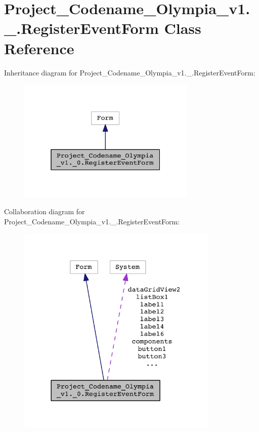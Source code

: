 \hypertarget{classProject__Codename__Olympia__v1_1_1__0_1_1RegisterEventForm}{}\section{Project\+\_\+\+Codename\+\_\+\+Olympia\+\_\+v1.\+\_.\+Register\+Event\+Form Class Reference}
\label{classProject__Codename__Olympia__v1_1_1__0_1_1RegisterEventForm}


Inheritance diagram for Project\+\_\+\+Codename\+\_\+\+Olympia\+\_\+v1.\+\_.\+Register\+Event\+Form\+:\nopagebreak
\begin{figure}[H]
\begin{center}
\leavevmode
\includegraphics[width=241pt]{classProject__Codename__Olympia__v1_1_1__0_1_1RegisterEventForm__inherit__graph}
\end{center}
\end{figure}


Collaboration diagram for Project\+\_\+\+Codename\+\_\+\+Olympia\+\_\+v1.\+\_.\+Register\+Event\+Form\+:\nopagebreak
\begin{figure}[H]
\begin{center}
\leavevmode
\includegraphics[width=273pt]{classProject__Codename__Olympia__v1_1_1__0_1_1RegisterEventForm__coll__graph}
\end{center}
\end{figure}
